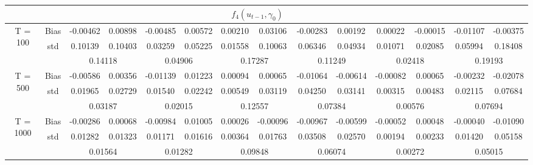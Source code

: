 \documentclass[a4paper,12pt,times,numbered,print,index]{report}
\numberwithin{equation}{section}
\begin{document}
\begin{table}[htbp]
\begin{adjustbox}{max width=\textwidth}
\begin{tabular}{cccccccccccccc}
    \midrule
    &       & \multicolumn{10}{c}{$f_4 (u_{t-1}, \gamma_0)$}                \\
    \midrule
    \multirow{3}[1]{*}{T = 100} & Bias  & -0.00462 & 0.00898 & -0.00485 & 0.00572 & 0.00210 & 0.03106 & -0.00283 & 0.00192 & 0.00022 & -0.00015 & -0.01107 & -0.00375 \\
          & std   & 0.10139 & 0.10403 & 0.03259 & 0.05225 & 0.01558 & 0.10063 & 0.06346 & 0.04934 & 0.01071 & 0.02085 & 0.05994 & 0.18408 \\
          &       & \multicolumn{2}{c}{0.14118} & \multicolumn{2}{c}{0.04906} & \multicolumn{2}{c}{0.17287} & \multicolumn{2}{c}{0.11249} & \multicolumn{2}{c}{0.02418} & \multicolumn{2}{c}{0.19193} \\
    \multirow{3}[0]{*}{T = 500} & Bias  & -0.00586 & 0.00356 & -0.01139 & 0.01223 & 0.00094 & 0.00065 & -0.01064 & -0.00614 & -0.00082 & 0.00065 & -0.00232 & -0.02078 \\
          & std   & 0.01965 & 0.02729 & 0.01540 & 0.02242 & 0.00549 & 0.03119 & 0.04250 & 0.03141 & 0.00315 & 0.00483 & 0.02115 & 0.07684 \\
          &       & \multicolumn{2}{c}{0.03187} & \multicolumn{2}{c}{0.02015} & \multicolumn{2}{c}{0.12557} & \multicolumn{2}{c}{0.07384} & \multicolumn{2}{c}{0.00576} & \multicolumn{2}{c}{0.07694} \\
    \multirow{3}[1]{*}{T = 1000} & Bias  & -0.00286 & 0.00068 & -0.00984 & 0.01005 & 0.00026 & -0.00096 & -0.00967 & -0.00599 & -0.00052 & 0.00048 & -0.00040 & -0.01090 \\
          & std   & 0.01282 & 0.01323 & 0.01171 & 0.01616 & 0.00364 & 0.01763 & 0.03508 & 0.02570 & 0.00194 & 0.00233 & 0.01420 & 0.05158 \\
          &       & \multicolumn{2}{c}{0.01564} & \multicolumn{2}{c}{0.01282} & \multicolumn{2}{c}{0.09848} & \multicolumn{2}{c}{0.06074} & \multicolumn{2}{c}{0.00272} & \multicolumn{2}{c}{0.05015} \\
    \bottomrule
    \bottomrule
    \end{tabular}%
    \end{adjustbox}
  \label{s_f34}%
\end{table}%
\end{document}
